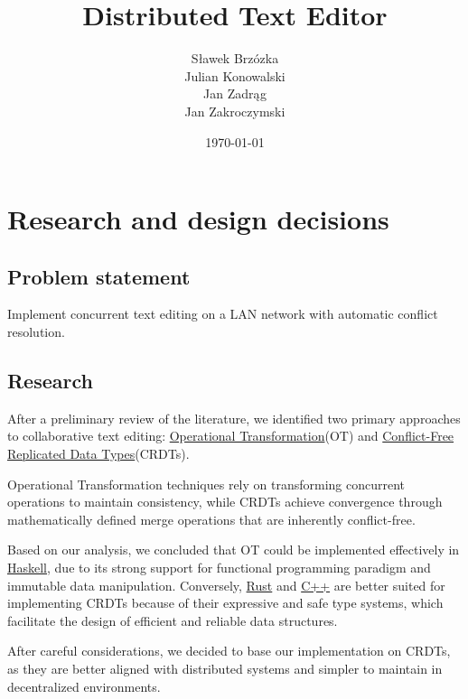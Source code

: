 \documentclass[12pt]{article}
\title{\Huge \textbf{Distributed Text Editor}}
\author{%
  Sławek Brzózka \\
  Julian Konowalski \\
  Jan Zadrąg \\
  Jan Zakroczymski \\
}
\date{\today}
\begin{document}
\maketitle
\thispagestyle{fancy}
\clearpage

\tableofcontents
\clearpage

\section{Research and design decisions}
\subsection{Problem statement}

Implement concurrent text editing on a LAN network with automatic conflict resolution.

\subsection{Research}

After a preliminary review of the literature, we identified two primary approaches to collaborative 
text editing: \href{https://en.wikipedia.org/wiki/Operational_transformation}{Operational Transformation}(OT) 
and \href{https://en.wikipedia.org/wiki/Conflict-free_replicated_data_type}{Conflict-Free Replicated Data Types}(CRDTs).

Operational Transformation techniques rely on transforming concurrent operations to maintain consistency, 
while CRDTs achieve convergence through mathematically defined merge operations that are inherently 
conflict-free.

Based on our analysis, we concluded that OT could be implemented effectively in \href{https://www.haskell.org/}{Haskell}, 
due to its strong support for functional programming paradigm and immutable data manipulation. Conversely, 
\href{https://www.rust-lang.org}{Rust} and \href{https://isocpp.org/}{C++} are better suited for implementing 
CRDTs because of their expressive and safe type systems, which facilitate the design of efficient and 
reliable data structures.

After careful considerations, we decided to base our implementation on CRDTs, as they are better aligned 
with distributed systems and simpler to maintain in decentralized environments.
\end{document}
